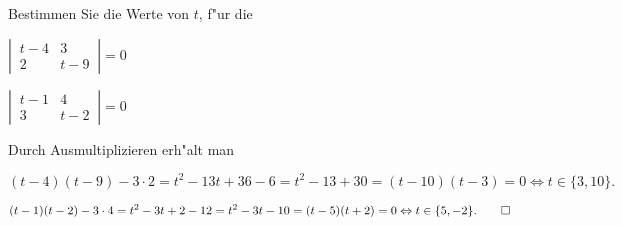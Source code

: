 Bestimmen Sie die Werte von $t$, f"ur die
\begin{teilaufgaben}
\item
$
\left|\,\begin{matrix}
t-4&3\\2&t-9
\end{matrix}\,\right|=0
$
\item
$
\left|\,\begin{matrix}
t-1&4\\3&t-2
\end{matrix}\,\right|=0
$
\end{teilaufgaben}

\begin{loesung}
Durch Ausmultiplizieren erh"alt man
\begin{teilaufgaben}
\item
\[
(t-4)(t-9)-3\cdot 2=t^2 -13t +36-6=t^2-13+30=(t-10)(t-3)=0\Leftrightarrow t\in\{3,10\}.
\]
\item
\[
(t-1)(t-2)-3\cdot 4=t^2-3t+2-12=t^2-3t-10=(t-5)(t+2)=0\Leftrightarrow t\in\{5,-2\}.
\qedhere
\]
\end{teilaufgaben}
\end{loesung}

